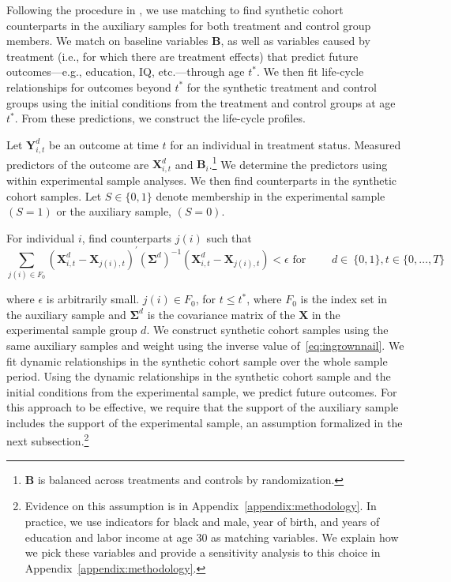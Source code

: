 Following the procedure in \citet{Heckman_Ichimura_etal_1998_REStud}, we use matching to find synthetic cohort counterparts in the auxiliary samples for both treatment and control group members. We match on baseline variables $\bm{B}$, as well as variables caused by treatment (i.e., for which there are treatment effects) that predict future outcomes---e.g., education, IQ, etc.---through age $t^{\ast}$. We then fit life-cycle relationships for outcomes beyond $t^{\ast}$ for the synthetic treatment and control groups using the initial conditions from the treatment and control groups at age $t^{\ast}$. From these predictions, we construct the life-cycle profiles. 

Let $\bm{Y}^{d}_{i,t}$ be an outcome at time $t$ for an individual in treatment status. Measured predictors of the outcome are $\bm{X}^{d}_{i,t}$ and $\bm{B}_i$.\footnote{$\bm{B}$ is balanced across treatments and controls by randomization.} We determine the predictors using within experimental sample analyses. We then find counterparts in the synthetic cohort samples. Let $S \in \{ 0,1\}$ denote membership in the experimental sample $(S=1)$ or the auxiliary sample, $(S=0)$.

For individual $i$, find counterparts $j(i)$ such that
\begin{equation}\label{eq:ingrownnail}
\sum_{j(i)\in F_0} \left( \bm{X}^{d}_{i,t} - \bm{X}_{j(i),t} \right)^{\prime} {\left( \bm{\Sigma}^d\right)}^{-1} \left(\bm{X}^{d}_{i,t} - \bm{X}_{j(i),t} \right) < \epsilon \text{ for } \qquad d \in \ \{0,1\}, t \in \{0,\dots,T\}
\end{equation}

\noindent where $\epsilon$ is arbitrarily small. $j(i) \in F_0$, for $t \leq t^{\ast}$, where $F_0$ is the index set in the auxiliary sample and $\bm{\Sigma}^d$ is the covariance matrix of the $\bm{X}$ in the experimental sample group $d$. We construct synthetic cohort samples using the same auxiliary samples and weight using the inverse value of~\eqref{eq:ingrownnail}. We fit dynamic relationships in the synthetic cohort sample over the whole sample period. Using the dynamic relationships in the synthetic cohort sample and the initial conditions from the experimental sample, we predict future outcomes. For this approach to be effective, we require that the support of the auxiliary sample includes the support of the experimental sample, an assumption formalized in the next subsection.\footnote{Evidence on this assumption is in Appendix~\ref{appendix:methodology}. In practice, we use indicators for black and male, year of birth, and years of education and labor income at age 30 as matching variables. We explain how we pick these variables and provide a sensitivity analysis to this choice in Appendix~\ref{appendix:methodology}.}

